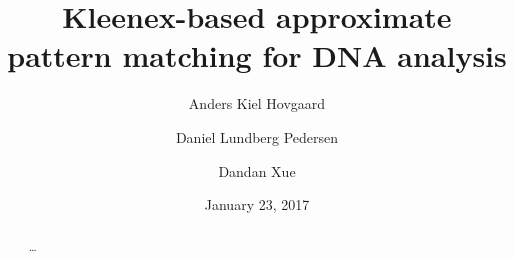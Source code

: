 \documentclass[a4paper,11pt]{article}
\title{Kleenex-based approximate pattern matching for DNA analysis}
\author{Anders Kiel Hovgaard \and Daniel Lundberg Pedersen \and Dandan Xue}
\date{January 23, 2017}
\theoremstyle{definition}
\begin{document}
\maketitle

\begin{abstract}
  \dots
\end{abstract}
\newpage

\tableofcontents
\newpage






\clearpage



\clearpage



\clearpage
\appendix

\end{document}

